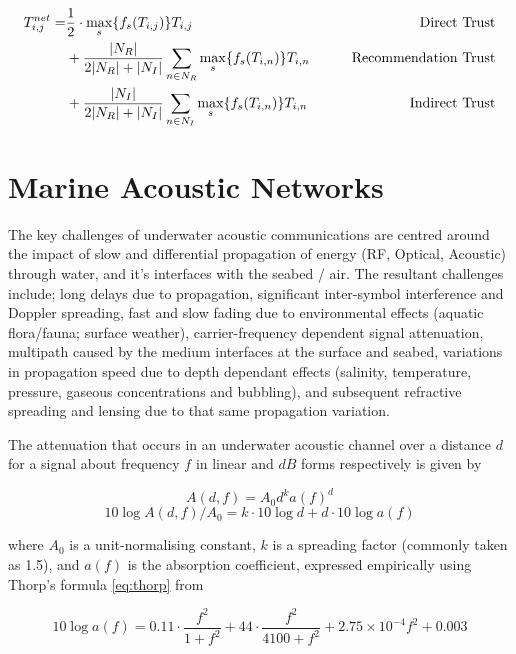 \documentclass[runningheads,a4paper]{llncs}
\begin{document}
\begin{align}
  \label{eq:networkeffects}
  T_{i,j}^{net}=&\frac{1}{2} \cdot \max_s\{f_s(T_{i,j})\} T_{i,j}&\qquad \text{Direct Trust}\notag \\
  &+ \frac{|N_R| }{2|N_R| + |N_I|}\sum_{n \in N_R} \max_s\{f_s(T_{i,n})\} T_{i,n}&\qquad \text{Recommendation Trust}\notag\\
  &+ \frac{|N_I| }{2|N_R| + |N_I|}\sum_{n \in N_I} \max_s\{f_s(T_{i,n})\} T_{i,n} &\qquad \text{Indirect Trust}
\end{align}


\section{Marine Acoustic Networks}\label{sec:marineacousticnetworks}

The key challenges of underwater acoustic communications are centred around the impact of slow and differential propagation of energy (RF, Optical, Acoustic) through water, and it's interfaces with the seabed / air.
The resultant challenges include; long delays due to propagation, significant inter-symbol interference and Doppler spreading, fast and slow fading due to environmental effects (aquatic flora/fauna; surface weather), carrier-frequency dependent signal attenuation, multipath caused by the medium interfaces at the surface and seabed, variations in propagation speed due to depth dependant effects (salinity, temperature, pressure, gaseous concentrations and bubbling), and subsequent refractive spreading and lensing due to that same propagation variation\cite{Partan2006}.

The attenuation that occurs in an underwater acoustic channel over a distance $d$ for a signal about frequency $f$ in linear and $dB$ forms respectively is given by

\begin{equation}
  \label{eq:acoattenuation}
  A(d,f) = A_0d^ka(f)^d
\end{equation}
\begin{equation}
  \label{eq:acoattenuationdb}
  10 \log A(d,f)/A_0 = k \cdot 10 \log d + d \cdot 10 \log a(f)
\end{equation}

where $A_0$ is a unit-normalising constant, $k$ is a spreading factor (commonly taken as 1.5), and $a(f)$ is the absorption coefficient, expressed empirically using Thorp's formula \eqref{eq:thorp} from \cite{Stojanovic2007}

\begin{equation}
  \label{eq:thorp}
  10 \log a(f) = 0.11 \cdot \frac{f^2}{1+f^2} + 44\cdot\frac{f^2}{4100+f^2}+ 2.75\times10^{-4} f^2 + 0.003
\end{equation}
\end{document}
